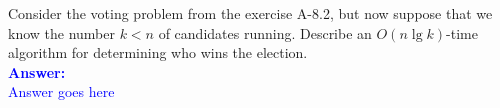 \item{}
Consider the voting problem from the exercise A-8.2, but now suppose that we
know the number $k<n$ of candidates running. Describe an $O(n\lg k)$-time
algorithm for determining who wins the election.\\[12pt]
\ifanswers
\textcolor{blue}{
\textbf{Answer:}\\[6pt]
Answer goes here
}
\newpage
\fi
